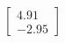 \documentclass[preview]{standalone}
\begin{document}
\begin{align*}
\begin{bmatrix} 4.91 \\ -2.95 \end{bmatrix}
\end{align*}
\end{document}
